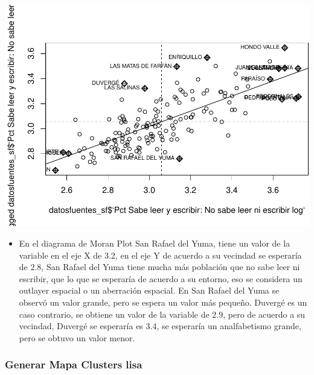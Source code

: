 \documentclass[11pt,]{article}
\providecommand{\tightlist}{%
\setlength{\itemsep}{0pt}\setlength{\parskip}{0pt}}
\begin{document}
\includegraphics{proyecto_files/figure-latex/unnamed-chunk-11-1.pdf}

\begin{itemize}
\tightlist
\item
  En el diagrama de Moran Plot San Rafael del Yuma, tiene un valor de la
  variable en el eje X de 3.2, en el eje Y de acuerdo a su vecindad se
  esperaría de 2.8, San Rafael del Yuma tiene mucha más población que no
  sabe leer ni escribir, que lo que se esperaría de acuerdo a su
  entorno, eso se considera un outlayer espacial o un aberración
  espacial. En San Rafael del Yuma se observó un valor grande, pero se
  espera un valor más pequeño. Duvergé es un caso contrario, se obtiene
  un valor de la variable de 2.9, pero de acuerdo a su vecindad, Duvergé
  se esperaría es 3.4, se esperaría un analfabetismo grande, pero se
  obtuvo un valor menor.
\end{itemize}

\subsubsection{Generar Mapa Clusters
lisa}\label{generar-mapa-clusters-lisa}
\end{document}
